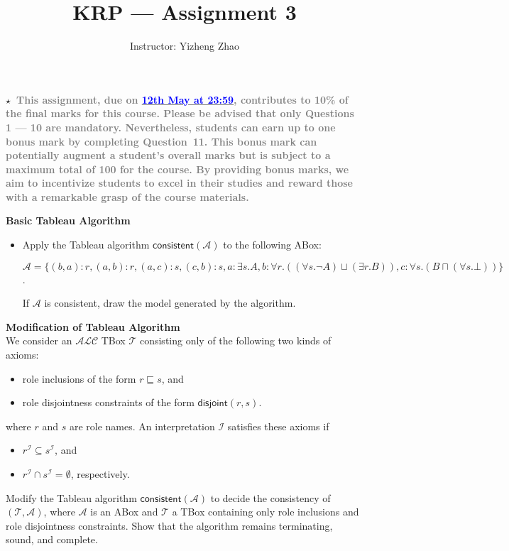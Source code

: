 \documentclass[12pt,a4paper]{article}
\newenvironment{problem}[2][{\color{red}Question}]{\begin{trivlist}
\item[\hskip \labelsep {\bfseries #1}\hskip \labelsep {\bfseries #2.}]}{\end{trivlist}}
\begin{document}
\title{{\color{blue}KRP --- Assignment 3}}
\author{Instructor: Yizheng Zhao}

 
\maketitle

\textbf{$\star$~\textcolor{gray}{This assignment, due on \underline{\textcolor{blue}{12th May at 23:59}}, contributes to 10\% of the final marks for this course. Please be advised that only Questions 1 --- 10 are mandatory. Nevertheless, students can earn up to one bonus mark by completing Question~11. This bonus mark can potentially augment a student's overall marks but is subject to a maximum total of 100 for the course. By providing bonus marks, we aim to incentivize students to excel in their studies and reward those with a remarkable grasp of the course materials.}}

\begin{problem}{{\color{red}1}}
\textbf{Basic Tableau Algorithm}
\begin{itemize}
    \item Apply the Tableau algorithm $\textsf{consistent}(\mathcal{A})$ to the following ABox:
    \begin{center}
    $\mathcal{A}=\{(b,a):r, (a,b):r, (a,c):s, (c,b):s, a:\exists s.A, b:\forall r.((\forall s.\neg A)\sqcup(\exists r.B)), c:\forall s.(B\sqcap(\forall s.\bot))\}$.
    \end{center}If $\mathcal{A}$ is consistent, draw the model generated by the algorithm.
\end{itemize}
\end{problem}


\begin{problem}{{\color{red}2}}
\textbf{Modification of Tableau Algorithm}\\
We consider an $\mathcal{ALC}$ TBox $\mathcal{T}$ consisting only of the following two kinds of axioms:
\begin{itemize}
    \item  role inclusions of the form $r\sqsubseteq s$, and
    \item role disjointness constraints of the form $\textsf{disjoint}(r,s)$.
\end{itemize}where $r$ and $s$ are role names. An interpretation $\mathcal{I}$ satisfies these axioms if
\begin{itemize}
    \item  $r^{\mathcal{I}}\subseteq s^{\mathcal{I}}$, and
    \item $r^{\mathcal{I}}\cap s^{\mathcal{I}}=\emptyset$, respectively.
\end{itemize}
Modify the Tableau algorithm $\textsf{consistent}(\mathcal{A})$ to decide the consistency of $(\mathcal{T},\mathcal{A})$, where $\mathcal{A}$ is an ABox and $\mathcal{T}$ a TBox containing only role inclusions and role disjointness constraints. Show that the algorithm remains terminating, sound, and complete.
\end{problem}
\end{document}
